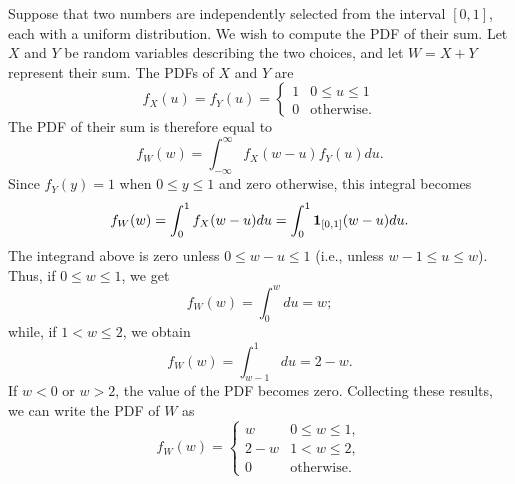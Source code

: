 \begin{example}
Suppose that two numbers are independently selected from the interval $[0,1]$, each with a uniform distribution.
We wish to compute the PDF of their sum.
Let $X$ and $Y$ be random variables describing the two choices, and let $W = X + Y$ represent their sum.
The PDFs of $X$ and $Y$ are
\begin{equation*}
f_X(u) = f_Y(u)
= \begin{cases} 1 & 0 \leq u \leq 1 \\
0 & \text{otherwise} . \end{cases}
\end{equation*}
The PDF of their sum is therefore equal to
\begin{equation*}
f_W(w) = \int_{-\infty}^{\infty} f_X(w - u) f_Y(u) du .
\end{equation*}
Since $f_Y(y) = 1$ when $0 \leq y \leq 1$ and zero otherwise, this integral becomes
\begin{equation*}
f_W (w) = \int_0^1 f_X(w - u) du
= \int_0^1 \mathbf{1}_{[0,1]}(w - u) du .
\end{equation*}
The integrand above is zero unless $0 \leq w - u \leq 1$ (i.e., unless $w - 1 \leq u \leq w$).
Thus, if $0 \leq w \leq 1$, we get
\begin{equation*}
f_W(w) = \int_0^w du = w ;
\end{equation*}
while, if $1 < w \leq 2$, we obtain
\begin{equation*}
f_W(w) = \int_{w - 1}^1 du = 2 - w .
\end{equation*}
If $w < 0$ or $w > 2$, the value of the PDF becomes zero.
Collecting these results, we can write the PDF of $W$ as
\begin{equation*}
f_W(w) = \begin{cases} w & 0 \leq w \leq 1, \\
2-w & 1 < w \leq 2, \\
0 & \text{otherwise} . \end{cases}
\end{equation*}
\end{example}

